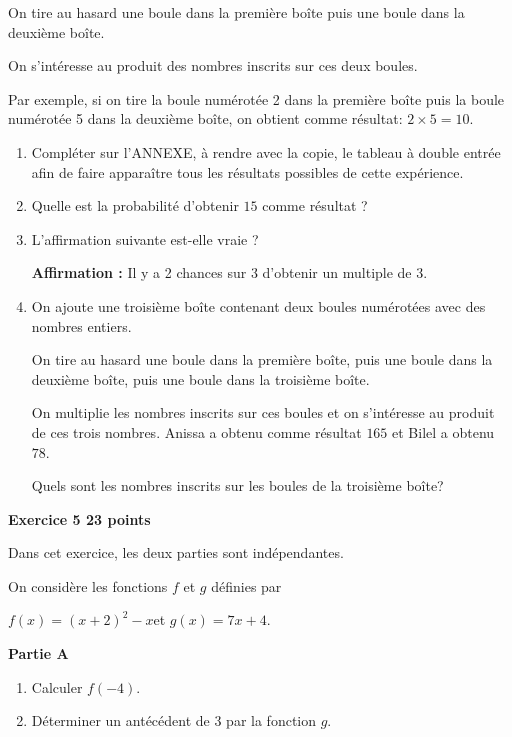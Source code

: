 \documentclass[11pt]{article}
\begin{document}
\medskip

On tire au hasard une boule dans la première boîte puis une boule dans la deuxième boîte.

On s'intéresse au produit des nombres inscrits sur ces deux boules.

Par exemple, si on tire la boule numérotée 2 dans la première boîte puis la boule numérotée 5 dans la deuxième boîte, on obtient comme résultat: $2 \times 5 = 10$.

\medskip

\begin{enumerate}
\item Compléter sur l'ANNEXE, à rendre avec la copie, le tableau à double entrée afin de faire apparaître tous les résultats possibles de cette expérience.
\item Quelle est la probabilité d'obtenir $15$ comme résultat ?
\item L'affirmation suivante est-elle vraie ?

\textbf{Affirmation :} Il y a 2 chances sur 3 d'obtenir un multiple de 3.
\item On ajoute une troisième boîte contenant deux boules numérotées avec des nombres entiers.

On tire au hasard une boule dans la première boîte, puis une boule dans la deuxième boîte, puis une boule dans la troisième boîte.

On multiplie les nombres inscrits sur ces boules et on s'intéresse au produit de ces trois nombres. Anissa a obtenu comme résultat $165$ et Bilel a obtenu $78$.

Quels sont les nombres inscrits sur les boules de la troisième boîte?
\end{enumerate}

\bigskip

\textbf{\large{}Exercice 5 \hfill 23 points}

\medskip

Dans cet exercice, les deux parties sont indépendantes.

On considère les fonctions $f$ et $g$ définies par 

\begin{center} $f(x) = (x + 2)^2 - x$\quad et \quad  $g(x) = 7x + 4$.\end{center}

\smallskip

\textbf{Partie A}

\medskip

\begin{enumerate}
\item Calculer $f(- 4)$.
\item Déterminer un antécédent de $3$ par la fonction $g$.
\end{enumerate}
\end{document}
